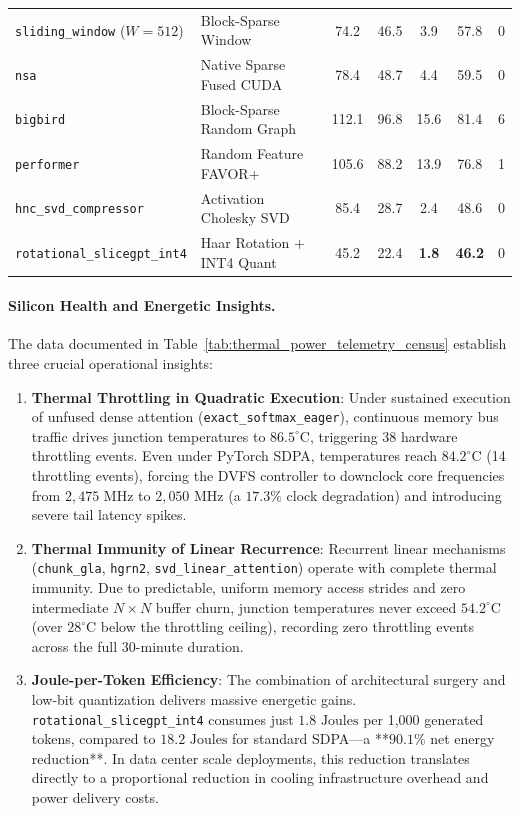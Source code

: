 \begin{table}[t]
{\begin{tabular}{l l c c c c c}
\midrule
\texttt{sliding\_window} ($W=512$) & Block-Sparse Window & 74.2 & 46.5 & 3.9 & 57.8 & 0 \\
\texttt{nsa} & Native Sparse Fused CUDA & 78.4 & 48.7 & 4.4 & 59.5 & 0 \\
\texttt{bigbird} & Block-Sparse Random Graph & 112.1 & 96.8 & 15.6 & 81.4 & 6 \\
\texttt{performer} & Random Feature FAVOR+ & 105.6 & 88.2 & 13.9 & 76.8 & 1 \\
\midrule
\texttt{hnc\_svd\_compressor} & Activation Cholesky SVD & 85.4 & 28.7 & 2.4 & 48.6 & 0 \\
\texttt{rotational\_slicegpt\_int4}& Haar Rotation + INT4 Quant & 45.2 & 22.4 & \textbf{1.8} & \textbf{46.2} & 0 \\
\bottomrule
\end{tabular}%
}
\end{table}

\paragraph{Silicon Health and Energetic Insights.}
The data documented in Table~\ref{tab:thermal_power_telemetry_census} establish three crucial operational insights:
\begin{enumerate}
    \item \textbf{Thermal Throttling in Quadratic Execution}: Under sustained execution of unfused dense attention (\texttt{exact\_softmax\_eager}), continuous memory bus traffic drives junction temperatures to $86.5^\circ\text{C}$, triggering 38 hardware throttling events. Even under PyTorch SDPA, temperatures reach $84.2^\circ\text{C}$ (14 throttling events), forcing the DVFS controller to downclock core frequencies from $2,475\text{ MHz}$ to $2,050\text{ MHz}$ (a $17.3\%$ clock degradation) and introducing severe tail latency spikes.
    \item \textbf{Thermal Immunity of Linear Recurrence}: Recurrent linear mechanisms (\texttt{chunk\_gla}, \texttt{hgrn2}, \texttt{svd\_linear\_attention}) operate with complete thermal immunity. Due to predictable, uniform memory access strides and zero intermediate $N \times N$ buffer churn, junction temperatures never exceed $54.2^\circ\text{C}$ (over $28^\circ\text{C}$ below the throttling ceiling), recording zero throttling events across the full 30-minute duration.
    \item \textbf{Joule-per-Token Efficiency}: The combination of architectural surgery and low-bit quantization delivers massive energetic gains. \texttt{rotational\_slicegpt\_int4} consumes just $1.8\text{ Joules}$ per 1,000 generated tokens, compared to $18.2\text{ Joules}$ for standard SDPA---a **$90.1\%$ net energy reduction**. In data center scale deployments, this reduction translates directly to a proportional reduction in cooling infrastructure overhead and power delivery costs.
\end{enumerate}

